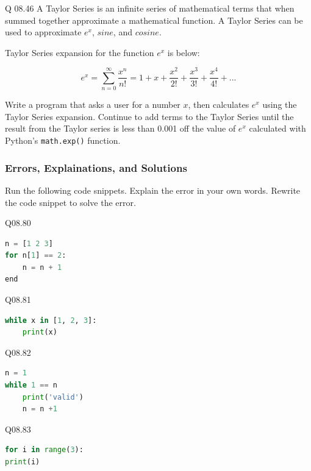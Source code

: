 \documentclass{book}
\begin{document}
Q 08.46 A Taylor Series is an infinite series of mathematical terms that
when summed together approximate a mathematical function. A Taylor
Series can be used to approximate \(e^x\), \(sine\), and \(cosine\).

Taylor Series expansion for the function \(e^x\) is below:

\[  {e^x} = \sum\limits_{n = 0}^\infty  {\frac{{{x^n}}}{{n!}}}  = 1 + x + \frac{{{x^2}}}{{2!}} + \frac{{{x^3}}}{{3!}} + \frac{{{x^4}}}{{4!}} + ... \]

Write a program that asks a user for a number \(x\), then calculates
\(e^x\) using the Taylor Series expansion. Continue to add terms to the
Taylor Series until the result from the Taylor series is less than 0.001
off the value of \(e^x\) calculated with Python's \lstinline!math.exp()!
function.
    




    
        \subsubsection{Errors, Explainations, and
Solutions}\label{errors-explainations-and-solutions}

Run the following code snippets. Explain the error in your own words.
Rewrite the code snippet to solve the error.
    




    
        Q08.80

\begin{lstlisting}[language=Python]
n = [1 2 3]
for n[1] == 2:
    n = n + 1
end
\end{lstlisting}

Q08.81

\begin{lstlisting}[language=Python]
while x in [1, 2, 3]:
    print(x)
\end{lstlisting}

Q08.82

\begin{lstlisting}[language=Python]
n = 1
while 1 == n
    print('valid')
    n = n +1
\end{lstlisting}

Q08.83

\begin{lstlisting}[language=Python]
for i in range(3):
print(i)
\end{lstlisting}
    
\end{document}
